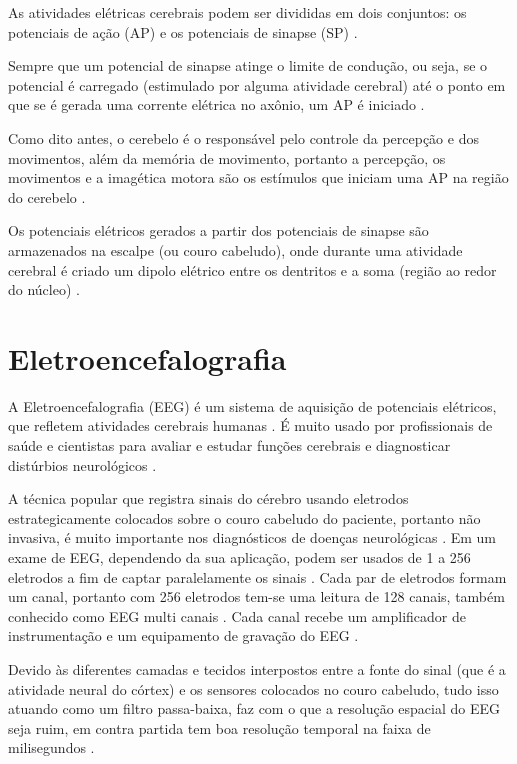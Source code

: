 As atividades elétricas cerebrais podem ser divididas em dois conjuntos: os potenciais de ação (AP) e os potenciais de sinapse (SP) \cite{SIULYDissertacao}.

Sempre que um potencial de sinapse atinge o limite de condução, ou seja, se o potencial é carregado (estimulado por alguma atividade cerebral) até o ponto em que se é gerada uma corrente elétrica no axônio, um AP é iniciado \cite{SIULYDissertacao}.

Como dito antes, o cerebelo é o responsável pelo controle da percepção e dos movimentos, além da memória de movimento, portanto a percepção, os movimentos e a imagética motora são os estímulos que iniciam uma AP na região do cerebelo \cite{alvarezneurobiomecanismos}.

Os potenciais elétricos gerados a partir dos potenciais de sinapse são armazenados na escalpe (ou couro cabeludo), onde durante uma atividade cerebral é criado um dipolo elétrico entre os dentritos e a soma (região ao redor do núcleo) \cite{SIULYDissertacao}.

\section{Eletroencefalografia}

A Eletroencefalografia (EEG) é um sistema de aquisição de potenciais elétricos, que refletem atividades cerebrais humanas \cite{Siulybook}. É muito usado por profissionais de saúde e cientistas para avaliar e estudar funções cerebrais e diagnosticar distúrbios neurológicos \cite{Siulybook}.

A técnica popular que registra sinais do cérebro usando eletrodos estrategicamente colocados sobre o couro cabeludo do paciente, portanto não invasiva, é muito importante nos diagnósticos de doenças neurológicas \cite{raobrain}. Em um exame de EEG, dependendo da sua aplicação, podem ser usados de 1 a 256 eletrodos a fim de captar paralelamente os sinais \cite{raobrain}. Cada par de eletrodos formam um canal, portanto com 256 eletrodos tem-se uma leitura de 128 canais, também conhecido como EEG multi canais \cite{raobrain}. Cada canal recebe um amplificador de instrumentação e um equipamento de gravação do EEG \cite{raobrain}.

Devido às diferentes camadas e tecidos interpostos entre a fonte do sinal (que é a atividade neural do córtex) e os sensores colocados no couro cabeludo, tudo isso atuando como um filtro passa-baixa, faz com o que a resolução 
espacial do EEG seja ruim, em contra partida tem boa resolução temporal na faixa de milisegundos \cite{raobrain}.
 
